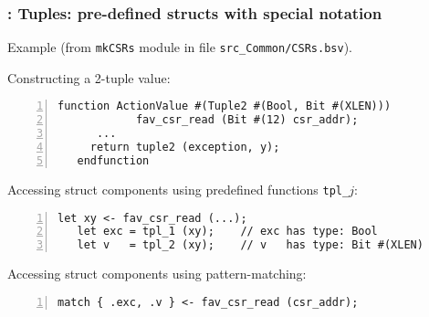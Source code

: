 
\begin{frame}[fragile]
\frametitle{{\BSV}: Tuples: pre-defined structs with special notation}

\footnotesize

Example (from {\tt mkCSRs} module in file {\tt src\_Common/CSRs.bsv}).

\vspace{2ex}

Constructing a 2-tuple value:
\begin{Verbatim}[frame=single, numbers=left]
   function ActionValue #(Tuple2 #(Bool, Bit #(XLEN)))
            fav_csr_read (Bit #(12) csr_addr);
      ...
	 return tuple2 (exception, y);
   endfunction
\end{Verbatim}

\vspace{2ex}

Accessing struct components using predefined functions {\tt tpl\_$j$}:
\begin{Verbatim}[frame=single, numbers=left]
   let xy <- fav_csr_read (...);
   let exc = tpl_1 (xy);    // exc has type: Bool
   let v   = tpl_2 (xy);    // v   has type: Bit #(XLEN)
\end{Verbatim}

\vspace{2ex}

Accessing struct components using pattern-matching:
\begin{Verbatim}[frame=single, numbers=left]
   match { .exc, .v } <- fav_csr_read (csr_addr);
\end{Verbatim}

\end{frame}


